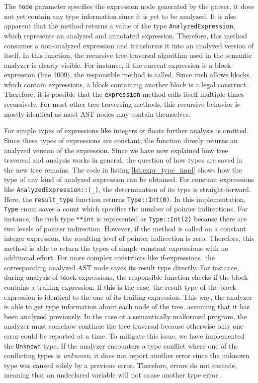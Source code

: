 The \texttt{node} parameter specifies the expression node generated by the parser,
it does not yet contain any type information since it is yet to be analyzed.
It is also apparent that the method returns a value of the type \texttt{AnalyzedExpression},
which represents an analyzed and annotated expression.
Therefore, this method consumes a non-analyzed expression and transforms it into an analyzed version of itself.
In this function, the recursive tree-traversal algorithm used in the semantic analyzer is clearly visible.
For instance, if the current expression is a block-expression (line 1009), the responsible method is called.
Since rush allows blocks which contain expressions, a block containing another block is a legal construct.
Therefore, it is possible that the \texttt{expression} method calls itself multiple times recursively.
For most other tree-traversing methods, this recursive behavior is mostly identical as most AST nodes may contain themselves.

For simple types of expressions like integers or floats further analysis is omitted.
Since these types of expressions are constant, the function direcly returns an analyzed version of the expression.
Since we have now explained how tree traversal and analysis works in general, the question of how types are saved in the new tree remains.
The code in listing \ref{lst:expr_type_impl} shows how the type of any kind of analyzed expression can be obtained.
For constant expressions like \verb|AnalyzedExpression::(_)|, the determination of its type is straight-forward.
Here, the \texttt{result\_type} function returns \verb|Type::Int(0)|.
In this implementation, \texttt{Type} enum saves a count which specifies the number of pointer indirections.
For instance, the rush type \texttt{**int} is represented as \verb|Type::Int(2)| because there are two levels of pointer indirection.
However, if the method is called on a constant integer expression, the resulting level of pointer indirection is zero.
Therefore, this method is able to return the types of simple constant expressions with no additional effort.
For more complex constructs like if-expressions,
the corresponding analyzed AST node saves its result type directly.
For instance, during analysis of block expressions,
the responsible function checks if the block contains a trailing expression.
If this is the case, the result type of the block expression is identical to the one of its trailing expression.
This way, the analyzer is able to get type information about each node of the tree, assuming that it has been analyzed previously.
In the case of a semantically malformed program,
the analyzer must somehow continue the tree traversal because otherwise only one error could be reported at a time.
To mitigate this issue, we have implemented the \texttt{Unknown} type.
If the analyzer encounters a type conflict where one of the conflicting types is \emph{unknown},
it does not report another error since the unknown type was caused solely by a previous error.
Therefore, errors do not cascade, meaning that an undeclared variable will not cause another type error.

